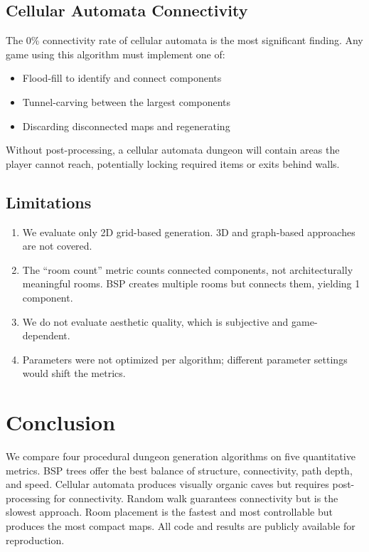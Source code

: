 \documentclass[11pt,a4paper]{article}
\begin{document}
\subsection{Cellular Automata Connectivity}

The 0\% connectivity rate of cellular automata is the most significant finding. Any game using this algorithm must implement one of:
\begin{itemize}
    \item Flood-fill to identify and connect components
    \item Tunnel-carving between the largest components
    \item Discarding disconnected maps and regenerating
\end{itemize}

Without post-processing, a cellular automata dungeon will contain areas the player cannot reach, potentially locking required items or exits behind walls.

\subsection{Limitations}

\begin{enumerate}
    \item We evaluate only 2D grid-based generation. 3D and graph-based approaches are not covered.
    \item The ``room count'' metric counts connected components, not architecturally meaningful rooms. BSP creates multiple rooms but connects them, yielding 1 component.
    \item We do not evaluate aesthetic quality, which is subjective and game-dependent.
    \item Parameters were not optimized per algorithm; different parameter settings would shift the metrics.
\end{enumerate}

\section{Conclusion}

We compare four procedural dungeon generation algorithms on five quantitative metrics. BSP trees offer the best balance of structure, connectivity, path depth, and speed. Cellular automata produces visually organic caves but requires post-processing for connectivity. Random walk guarantees connectivity but is the slowest approach. Room placement is the fastest and most controllable but produces the most compact maps. All code and results are publicly available for reproduction.
\end{document}
